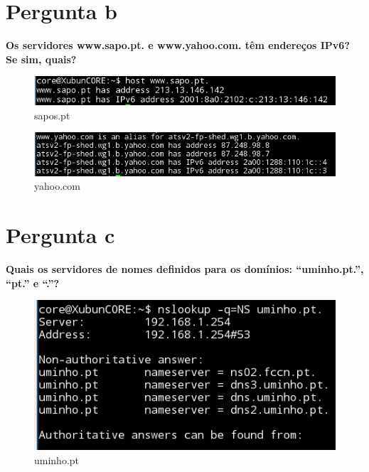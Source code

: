 \documentclass[a4paper]{report}
\begin{document}
\section{Pergunta b}
\textbf{Os servidores www.sapo.pt. e www.yahoo.com. têm endereços IPv6? Se sim,
quais?}
\begin{figure}[H]
    \centering 
    \includegraphics[width=\textwidth]{images/sapopt.png}  
    \caption{sapos.pt}
    \label{fig:sapopt}
\end{figure}

\begin{figure}[H]
    \centering 
    \includegraphics[width=\textwidth]{images/yahoocom.png}  
    \caption{yahoo.com}
    \label{fig:yahoocom}
\end{figure}


\section{Pergunta c}
\textbf{Quais os servidores de nomes definidos para os domínios: “uminho.pt.”,
“pt.” e “.”?}
\begin{figure}[H]
    \centering 
    \includegraphics[width=\textwidth]{images/uminhopt.png}  
    \caption{uminho.pt}
    \label{fig:uminhopt}
\end{figure}
\end{document}
